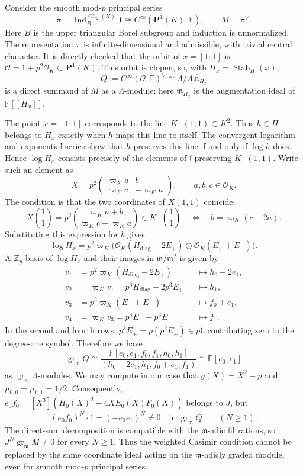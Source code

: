 \documentclass[11pt]{article}
\numberwithin{equation}{section}
\theoremstyle{definition}
\theoremstyle{remark}
\newcommand{\F}{\mathbb F}
\newcommand{\Z}{\mathbb Z}
\newcommand{\cO}{\mathcal O}
\newcommand{\fm}{\mathfrak m}
\DeclareMathOperator{\GL}{GL}
\DeclareMathOperator{\gr}{gr}
\begin{document}
Consider the smooth mod-$p$ principal series
\[
 \pi=\operatorname{Ind}_B^{\GL_2(K)}\mathbf1
     \cong C^\infty(\mathbf P^1(K),\F),
 \qquad M=\pi^\vee.
\]
Here $B$ is the upper triangular Borel subgroup and induction is
unnormalized. The representation $\pi$ is infinite-dimensional and
admissible, with trivial central character. 
It is directly checked that the orbit of $x=[1:1]$ is 
$\mathcal O=1+p^2\cO_K\subset \mathbf P^1(K)$. This orbit is
clopen, so, with $H_x=\operatorname{Stab}_H(x)$,
\[
 Q:=C^\infty(\mathcal O,\F)^\vee
   \cong\Lambda/\overline{\Lambda\fm_{H_x}}
\]
is a direct summand of $M$ as a $\Lambda$-module; here $\fm_{H_x}$
is the augmentation ideal of $\F[[H_x]]$.

The point $x=[1:1]$ corresponds to the line $K\cdot(1,1)\subset K^2$.
Thus $h\in H$ belongs to $H_x$ exactly when $h$ maps this line to
itself. The convergent
logarithm and exponential series show that $h$ preserves this line
if and only if $\log h$ does. Hence $\log H_x$ consists precisely of
the elements of $\mathfrak l$ preserving $K\cdot(1,1)$. Write such an element as
\[
 X=p^2\begin{pmatrix}\varpi_K a&b\\
                      \varpi_K c&-\varpi_K a\end{pmatrix},
 \qquad a,b,c\in\cO_K.
\]
The condition is that the two coordinates of $X(1,1)$ coincide:
\[
 X\binom11=p^2\binom{\varpi_K a+b}{\varpi_K c-\varpi_K a}
       \in K\cdot\binom11
 \quad\Longleftrightarrow\quad b=\varpi_K(c-2a).
\]
Substituting this expression for $b$ gives
\[
 \log H_x=p^2\varpi_K\bigl(
    \cO_K(H_{\mathrm{diag}}-2E_+)
       \oplus\cO_K(E_++E_-)\bigr).
\]
A $\Z_p$-basis of $\log H_x$ and their images in
$\fm/\fm^2$ is given by 
\[
 \begin{aligned}
 v_1&=p^2\varpi_K(H_{\mathrm{diag}}-2E_+)
       &&\longmapsto h_0-2e_1,\\
 v_2&=\varpi_Kv_1=p^3H_{\mathrm{diag}}-2p^3E_+
       &&\longmapsto h_1,\\
 v_3&=p^2\varpi_K(E_++E_-)
       &&\longmapsto f_0+e_1,\\
 v_4&=\varpi_Kv_3=p^3E_++p^3E_-
       &&\longmapsto f_1.
 \end{aligned}
\]
In the second and fourth rows, $p^3E_+=p(p^2E_+)\in p\mathfrak l$,
contributing zero to the degree-one symbol.
Therefore we have 
\[
 \gr_{\fm}Q\cong
 \frac{\F[e_0,e_1,f_0,f_1,h_0,h_1]}
      {(h_0-2e_1,h_1,f_0+e_1,f_1)}
 \cong\F[e_0,e_1]
\]
as $\gr_{\fm}\Lambda$-modules. 
We may compute in our case that $g(X)=X^2-p$ 
and $\mu_{0,0}=\mu_{0,1}=1/2$. Consequently,
$e_0f_0=[X^3](H_0(X)^2+4XE_0(X)F_0(X))$ belongs to $J$, but
\[
 (e_0f_0)^N\cdot1=(-e_0e_1)^N\ne0
 \quad\text{in }\gr_{\fm}Q\qquad(N\geq1).
\]
The direct-sum decomposition is compatible with the $\fm$-adic 
filtrations, so $J^N\gr_{\fm}M\ne0$ for every $N\geq1$.
Thus the weighted Casimir condition cannot be replaced by the same
coordinate ideal acting on the $\fm$-adicly graded module, even for
smooth mod-$p$ principal series.
\end{document}
